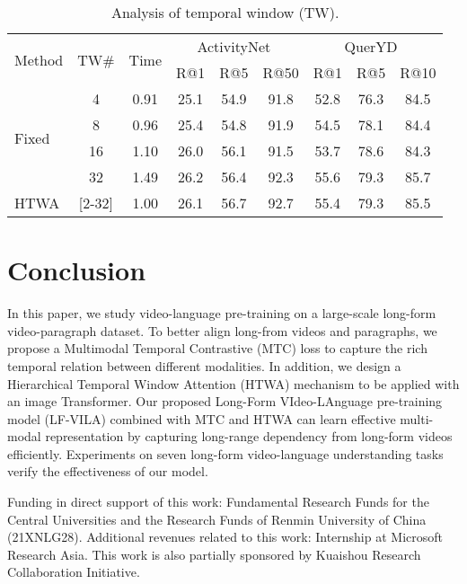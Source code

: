 \documentclass{article}
\begin{document}
\begin{table}[h!]
    \small
    \centering
    \caption{Analysis of temporal window (TW).}
    \begin{tabular}{l  c  c c c c c c c} 
    \toprule
    \multirow{2}{*}{Method}&\multirow{2}{*}{TW\#}&\multirow{2}{*}{Time}&\multicolumn{3}{c}{ActivityNet~\cite{krishna2017actnetcaption}} & \multicolumn{3}{c}{QuerYD~\cite{oncescu2021queryd}} \\
     \cmidrule{4-9}
    & & & R@1 & R@5 & R@50 &R@1 & R@5 & R@10 \\
    \cmidrule{1-9}
    \multirow{4}{*}{Fixed} 
    &4 &0.91 &25.1 &54.9 & 91.8 &52.8 &76.3 &84.5 \\
    &8 &0.96 &25.4 & 54.8 & 91.9 &54.5 &78.1 &84.4 \\
    &16 &1.10 &26.0 & 56.1 & 91.5 &53.7 &78.6 &84.3 \\
    &32 &1.49 &26.2 & 56.4 & 92.3 &55.6 &79.3 &85.7 \\
    \cmidrule{1-9}
    HTWA  &[2-32] &1.00 & 26.1 & 56.7 &92.7 &55.4 &79.3 &85.5\\ 

    \bottomrule
    \end{tabular}
    \label{tab:abl_window}
\end{table}
 \section{Conclusion}
\label{conclusion}
In this paper, we study video-language pre-training on a large-scale long-form video-paragraph dataset.
To better align long-from videos and paragraphs, we propose a Multimodal Temporal Contrastive (MTC) loss to capture the rich temporal relation between different modalities.
In addition, we design a Hierarchical Temporal Window Attention (HTWA) mechanism to be applied with an image Transformer. Our proposed Long-Form VIdeo-LAnguage pre-training model (LF-VILA) combined with MTC and HTWA can learn effective multi-modal representation by capturing long-range dependency from long-form videos efficiently.
Experiments on seven long-form video-language understanding tasks verify the effectiveness of our model. 
\begin{ack}
Funding in direct support of this work: Fundamental Research Funds for the Central Universities and the Research Funds of Renmin University of China (21XNLG28). Additional revenues related to this work: Internship at Microsoft Research Asia. This work is also partially sponsored by Kuaishou  Research Collaboration Initiative.
\end{ack}
\end{document}
